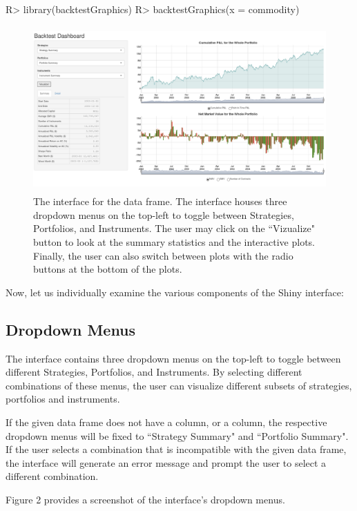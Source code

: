 \documentclass[article]{jss}
\begin{document}
\begin{Schunk}
\begin{Sinput}
R> library(backtestGraphics)
R> backtestGraphics(x = commodity)
\end{Sinput}
\end{Schunk}


\begin{figure}[H]
\centering
\includegraphics[width = \textwidth, height = 2.5in]{img/overallscreen.png}
\caption{The  interface for the  data frame. The interface houses three dropdown menus on the top-left to toggle between Strategies, Portfolios, and Instruments. The user may click on the ``Vizualize" button to look at the summary statistics and the interactive plots. Finally, the user can also switch between plots with the radio buttons at the bottom of the plots.
}
\end{figure}
Now, let us individually examine the various components of the Shiny interface:


\subsection{Dropdown Menus}
The interface contains three dropdown menus on the top-left to toggle between different Strategies, Portfolios, and Instruments. By selecting different combinations of these menus, the user can visualize different subsets of strategies, portfolios and instruments.


\noindent
If the given data frame does not have a  column, or a  column, the respective dropdown menus will be fixed to ``Strategy Summary" and ``Portfolio Summary". If the user selects a combination that is incompatible with the given data frame, the interface will generate an error message and prompt the user to select a different combination.

\noindent
Figure 2 provides a screenshot of the interface's dropdown menus.
\end{document}
